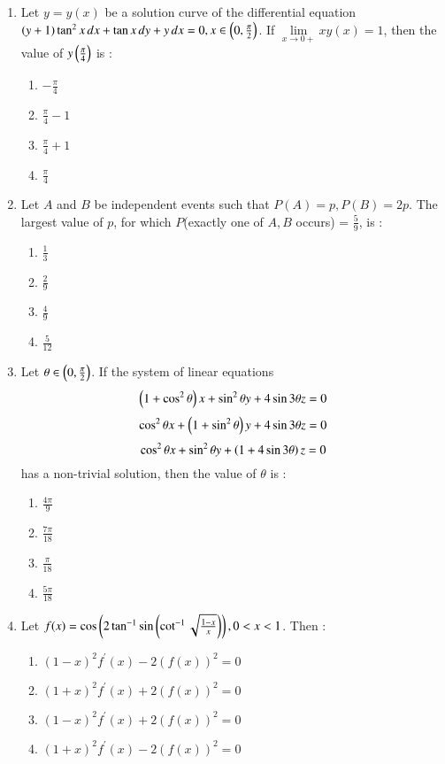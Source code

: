\documentclass[journal,12pt,twocolumn]{IEEEtran}
\theoremstyle{remark}
\begin{document}
\begin{enumerate}
    \item Let $y=y(x)$ be a solution curve of the differential equation $(y+1)\tan^2{x}\,dx + \tan{x}\,dy + y\,dx=0, x\in\left(0,\frac{\pi}{2}\right)$. If $\lim\limits_{x\to0+}xy(x)=1$, then the value of $y\left(\frac{\pi}{4}\right)$ is :
        \begin{enumerate}
            \item $-\frac{\pi}{4}$
            \item $\frac{\pi}{4}-1$
            \item $\frac{\pi}{4}+1$
            \item $\frac{\pi}{4}$
        \end{enumerate}

    \item Let $A$ and $B$ be independent events such that $P(A) = p, P(B) = 2p$. The largest value of $p$, for which $P$(exactly one of $A, B$ occurs) = $\frac{5}{9}$, is :
        \begin{enumerate}
            \item $\frac{1}{3}$
            \item $\frac{2}{9}$
            \item $\frac{4}{9}$
            \item $\frac{5}{12}$
        \end{enumerate}

    \item Let $\theta\in\left(0,\frac{\pi}{2}\right)$. If the system of linear equations
            $$\left(1+\cos^2{\theta}\right)x+\sin^2{\theta}y+4\sin{3\theta}z=0$$
            $$\cos^2{\theta}x+\left(1+\sin^2{\theta}\right)y+4\sin{3\theta}z=0$$
            $$\cos^2{\theta}x+\sin^2{\theta}y+\left(1+4\sin{3\theta}\right)z=0$$
        has a non-trivial solution, then the value of $\theta$ is :
        \begin{enumerate}
            \item $\frac{4\pi}{9}$
            \item $\frac{7\pi}{18}$
            \item $\frac{\pi}{18}$
            \item $\frac{5\pi}{18}$
        \end{enumerate}

    \item Let $f(x)=\cos\left(2\tan^{-1}\sin\left(\cot^{-1}\sqrt{\frac{1-x}{x}}\right)\right), 0<x<1$. Then :
        \begin{enumerate}
            \item $(1-x)^2f^\prime(x)-2(f(x))^2=0$
            \item $(1+x)^2f^\prime(x)+2(f(x))^2=0$
            \item $(1-x)^2f^\prime(x)+2(f(x))^2=0$
            \item $(1+x)^2f^\prime(x)-2(f(x))^2=0$
        \end{enumerate}



\end{enumerate}
\end{document}
